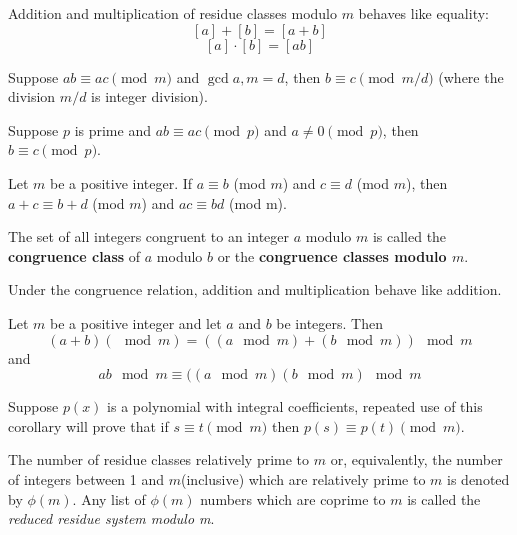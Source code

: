 Addition and multiplication of residue classes modulo $m$ behaves like equality:
$$[a] + [b] = [a+b]$$
$$[a]\cdot[b]=[ab]$$

\begin{theorem}
Suppose $ab \equiv ac\pmod{m}$ and $\gcd{a,m}=d$, then $b\equiv c\pmod{m/d}$ (where the division $m/d$ is integer division).
\end{theorem}

\begin{corollary}
Suppose $p$ is prime and $ab\equiv ac\pmod{p}$ and $a \ne 0\pmod{p}$, then $b\equiv c\pmod{p}$.
\end{corollary}

\begin{theorem}
Let $m$ be a positive integer. If $a \equiv b$ (mod $m$) and $c \equiv d$ (mod $m$), then $a+c \equiv b+d$ (mod $m$) and $ac \equiv bd$ (mod m).
\end{theorem}

\begin{definition}
The set of all integers congruent to an integer $a$ modulo $m$ is called the \textbf{congruence class} of $a$ modulo $b$ or the \textbf{congruence classes modulo $m$}.
\end{definition}

Under the congruence relation, addition and multiplication behave like addition.
\begin{corollary}
Let $m$ be a positive integer and let $a$ and $b$ be integers. Then
$$(a+b) (\mod {m}) = ((a \mod {m}) + (b \mod  {m} )) \mod {m}$$
and
$$ab \mod{m} \equiv ((a \mod{m})(b \mod{m}) \mod{m}$$
\end{corollary}
\begin{notes}
Suppose $p(x)$ is a polynomial with integral coefficients, repeated use of this corollary will prove that if $s\equiv t\pmod{m}$ then $p(s) \equiv p(t)\pmod{m}$.
\end{notes}

\begin{definition}
The number of residue classes relatively prime to $m$ or, equivalently, the number of integers between 1 and $m$(inclusive) which are relatively prime to $m$ is denoted by $\phi(m)$. Any list of  $\phi(m)$ numbers which are coprime to $m$ is called the \textit{reduced residue system modulo m}.
\end{definition}



